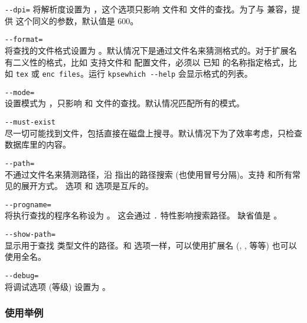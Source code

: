 \documentclass{article}
\begin{document}
\begin{ttdescription}
\item[\texttt{-{}-dpi=\var{num}}]\mbox{}
  将解析度设置为 ，这个选项只影响  文件和 
  文件的查找。为了与  兼容，提供 
  这个同义的参数，默认值是 600。

\item[\texttt{-{}-format=\var{name}}]\mbox{}\\
  将查找的文件格式设置为 。默认情况下是通过文件名来猜测格式的。对于扩展名
有二义性的格式，比如 \MP{} 支持文件和  配置文件，必须以 \KPS{} 已知
的名称指定格式，比如 \texttt{tex} 或 \texttt{enc files}。运行
  \texttt{kpsewhich -{}-help} 会显示格式的列表。

\item[\texttt{-{}-mode=\var{string}}]\mbox{}\\
  设置模式为 ，只影响  和 
  文件的查找。默认情况匹配所有的模式。
\item[\texttt{-{}-must-exist}]\mbox{}\\
  尽一切可能找到文件，包括直接在磁盘上搜寻。默认情况下为了效率考虑，只检查
   数据库里的内容。
\item[\texttt{-{}-path=\var{string}}]\mbox{}\\
  不通过文件名来猜测路径，沿  指出的路径搜索
  (也使用冒号分隔)。支持 \samp{//} 和所有常见的展开方式。 选项
  和  选项是互斥的。
\item[\texttt{-{}-progname=\var{name}}]\mbox{}\\
  将执行查找的程序名称设为 \texttt{}。
  这会通过 \texttt{.} 特性影响搜索路径。
  缺省值是 。
\item[\texttt{-{}-show-path=\var{name}}]\mbox{}\\
  显示用于查找 \texttt{} 类型文件的路径。和 
  选项一样，可以使用扩展名 (, , 等等) 也可以使用全名。
\item[\texttt{-{}-debug=\var{num}}]\mbox{}\\
  将调试选项 (等级) 设置为 \texttt{}。
\end{ttdescription}


\subsubsection{使用举例}
\label{sec:examples-of-use}
\end{document}
